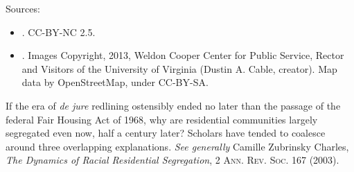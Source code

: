 

Sources:
\begin{itemize}
\item {}. CC-BY-NC 2.5.
\item {}. Images Copyright, 2013, Weldon Cooper Center
for Public Service, Rector and Visitors of the University of Virginia (Dustin A.
Cable, creator). Map data by OpenStreetMap, under CC-BY-SA.
\end{itemize}

If the era of \textit{de jure} redlining ostensibly ended no later than the
passage of the federal Fair Housing Act of 1968, why are residential
communities largely segregated even now, half a century later? Scholars have
tended to coalesce around three overlapping explanations. \textit{See generally}
Camille Zubrinsky Charles, \textit{The Dynamics of Racial Residential
Segregation}, 2 \textsc{Ann. Rev. Soc.} 167 (2003).

